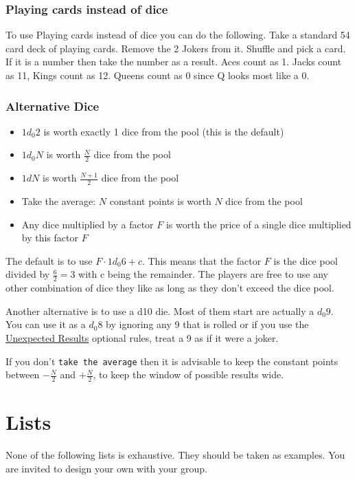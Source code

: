 \documentclass[11pt]{article}
\begin{document}
{\subsubsection{Playing cards instead of dice}
\label{sec:org293e5e3}

To use Playing cards instead of dice you can do the following. Take a standard 54 card deck of playing cards. Remove the 2 Jokers from it. Shuffle and pick a card. If it is a number then take the number as a result. Aces count as 1. Jacks count as 11, Kings count as 12. Queens count as 0 since Q looks most like a 0.


\subsubsection{Alternative Dice}
\label{sec:org49249b8}

\begin{itemize}
\item \(1 d_0 2\) is worth exactly 1 dice from the pool (this is the default)
\item \(1 d_0 N\) is worth \(\frac{N}{2}\) dice from the pool
\item \(1 d N\) is worth \(\frac{N+1}{2}\) dice from the pool
\item Take the average: \(N\) constant points is worth \(N\) dice from the pool
\item Any dice multiplied by a factor \(F\) is worth the price of a single dice multiplied by this factor \(F\)
\end{itemize}

The default is to use \(F \cdot 1 d_0 6 + c\). This means that the factor \(F\) is the dice pool divided by \(\frac{6}{2} = 3\) with c being the remainder. The players are free to use any other combination of dice they like as long as they don't exceed the dice pool.

Another alternative is to use a d10 die. Most of them start are actually a \(d_0 9\). You can use it as a \(d_0 8\) by ignoring any 9 that is rolled or if you use the \hyperref[sec:org441e5f0]{Unexpected Results} optional rules, treat a 9 as if it were a joker.

If you don't \texttt{take the average} then it is advisable to keep the constant points between \(-\frac{N}{2}\) and \(+\frac{N}{2}\), to keep the window of possible results wide.


\newpage
\section{Lists}
\label{sec:org320af5d}
None of the following lists is exhaustive. They should be taken as examples. You are invited to design your own with your group.

}
\end{document}
